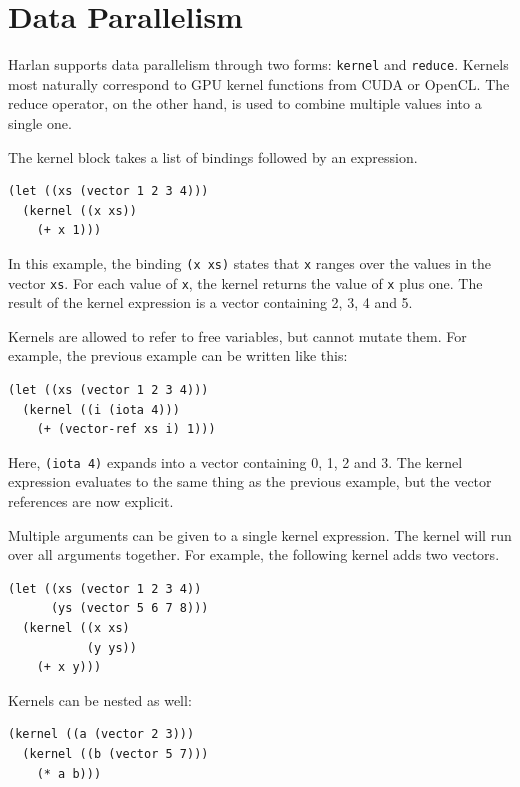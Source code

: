\documentclass[oneside]{report}
\begin{document}
\section{Data Parallelism}

Harlan supports data parallelism through two forms: \lstinline{kernel}
and \lstinline{reduce}.  Kernels most naturally correspond to GPU
kernel functions from CUDA or OpenCL.  The reduce operator, on the
other hand, is used to combine multiple values into a single one.

The kernel block takes a list of bindings followed by an
expression.

\begin{lstlisting}
(let ((xs (vector 1 2 3 4)))
  (kernel ((x xs))
    (+ x 1)))
\end{lstlisting}

In this example, the binding \lstinline{(x xs)} states that
\lstinline{x} ranges over the values in the vector \lstinline{xs}. For
each value of \lstinline{x}, the kernel returns the value of
\lstinline{x} plus one.  The result of the kernel expression is a
vector containing 2, 3, 4 and 5.

Kernels are allowed to refer to free variables, but cannot mutate
them.  For example, the previous example can be written like this:

\begin{lstlisting}
(let ((xs (vector 1 2 3 4)))
  (kernel ((i (iota 4)))
    (+ (vector-ref xs i) 1)))
\end{lstlisting}

Here, \lstinline{(iota 4)} expands into a vector containing 0, 1, 2
and 3. The kernel expression evaluates to the same thing as the
previous example, but the vector references are now explicit.

Multiple arguments can be given to a single kernel expression. The
kernel will run over all arguments together. For example, the
following kernel adds two vectors.

\begin{lstlisting}
(let ((xs (vector 1 2 3 4))
      (ys (vector 5 6 7 8)))
  (kernel ((x xs)
           (y ys))
    (+ x y)))
\end{lstlisting}

Kernels can be nested as well:

\begin{lstlisting}
(kernel ((a (vector 2 3)))
  (kernel ((b (vector 5 7)))
    (* a b)))  
\end{lstlisting}
\end{document}

